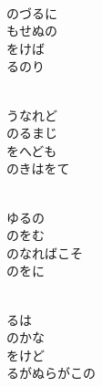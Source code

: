 \documentclass[10pt,b5j]{tarticle} %
\begin{document}
\vspace{1.5em} %
\newcommand{\linespace}{0.5em} %
\newcommand{\blocksize}{0.5\hsize} %
\newcommand{\itemmargin}{6em} %
\begin{enumerate} %
    \setlength{\itemindent}{\itemmargin} %
    \begin{minipage}[c]{\blocksize}
    
        \vspace{\linespace}
        \item~\\
        のづるに\\
        もせぬの\\
        をけば\\
        るのり
        
        \vspace{\linespace}
        \item~\\
        うなれど\\
        のるまじ\\
        をへども\\
        のきはをて
        
        \vspace{\linespace}
        \item~\\
        ゆるの\\
        のをむ\\
        のなればこそ\\
        のをに
        
        \vspace{\linespace}
        \item~\\
        るは\\
        のかな\\
        をけど\\
        るがぬらがこの
    
    \end{minipage}
\end{enumerate} %
\end{document}

